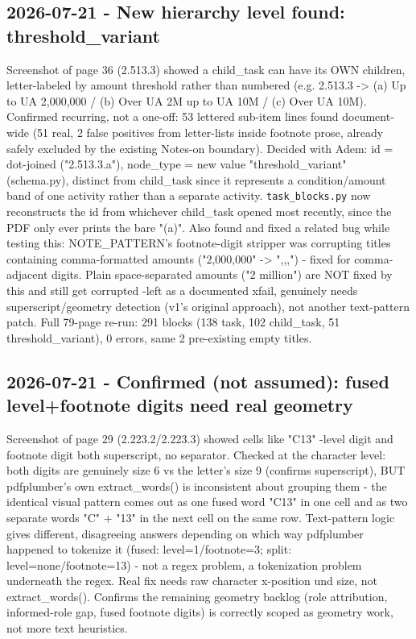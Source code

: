\subsection*{2026-07-21 - New hierarchy level found: threshold\_variant}
Screenshot of page 36 (2.513.3) showed a child\_task can have its OWN children, letter-labeled by amount threshold rather than numbered (e.g. 2.513.3 -> (a) Up to UA 2,000,000 / (b) Over UA 2M up to UA 10M / (c) Over UA 10M). Confirmed recurring, not a one-off: 53 lettered sub-item lines found document-wide (51 real, 2 false positives from letter-lists inside footnote prose, already safely excluded by the existing Notes-on boundary). Decided with Adem: id = dot-joined ("2.513.3.a"), node\_type = new value "threshold\_variant" (schema.py), distinct from child\_task since it represents a condition/amount band of one activity rather than a separate activity. \texttt{task\_\allowbreak{}blocks.py} now reconstructs the id from whichever child\_task opened most recently, since the PDF only ever prints the bare "(a)". Also found and fixed a related bug while testing this: NOTE\_PATTERN's footnote-digit stripper was corrupting titles containing comma-formatted amounts ("2,000,000" -> ",,,") - fixed for comma-adjacent digits. Plain space-separated amounts ("2 million") are NOT fixed by this and still get corrupted -left as a documented xfail, genuinely needs superscript/geometry detection (v1's original approach), not another text-pattern patch. Full 79-page re-run: 291 blocks (138 task, 102 child\_task, 51 threshold\_variant), 0 errors, same 2 pre-existing empty titles.

\subsection*{2026-07-21 - Confirmed (not assumed): fused level+footnote digits need real geometry}
Screenshot of page 29 (2.223.2/2.223.3) showed cells like "C13" -level digit and footnote digit both superscript, no separator. Checked at the character level: both digits are genuinely size 6 vs the letter's size 9 (confirms superscript), BUT pdfplumber's own extract\_words() is inconsistent about grouping them - the identical visual pattern comes out as one fused word "C13" in one cell and as two separate words "C" + "13" in the next cell on the same row. Text-pattern logic gives different, disagreeing answers depending on which way pdfplumber happened to tokenize it (fused: level=1/footnote=3; split: level=none/footnote=13) - not a regex problem, a tokenization problem underneath the regex. Real fix needs raw character x-position und size, not extract\_words(). Confirms the remaining geometry backlog (role attribution, informed-role gap, fused footnote digits) is correctly scoped as geometry work, not more text heuristics.

